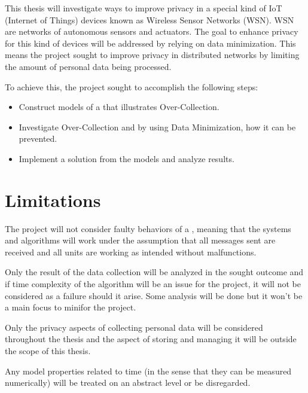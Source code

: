 This thesis will investigate ways to improve privacy in a special kind of IoT (Internet of Things) devices known as Wireless Sensor Networks (WSN). WSN are networks of autonomous sensors and actuators. The goal to enhance privacy for this kind of devices will be addressed by relying on data minimization. This means the project sought to improve privacy in distributed networks by limiting the amount of personal data being processed.

To achieve this, the project sought to accomplish the following steps:

\begin{itemize}
\item Construct models of a \wsn that illustrates Over-Collection.
\item Investigate Over-Collection and by using Data Minimization, how it can be prevented. 
\item Implement a solution from the models and analyze results.
\end{itemize} 

\section{Limitations}

The project will not consider faulty behaviors of a \wsn, meaning that the systems and algorithms will work under the assumption that all messages sent are received and all units are working as intended without malfunctions.

Only the result of the data collection will be analyzed in the sought outcome and if time complexity of the algorithm will be an issue for the project, it will not be considered as a failure should it arise. Some analysis will be done but it won't be a main focus to minifor the project.

Only the privacy aspects of collecting personal data will be considered throughout the thesis and the aspect of storing and managing it will be outside the scope of this thesis.

Any model properties related to time (in the sense that they can be measured numerically) will be treated on an abstract level or be disregarded. %


